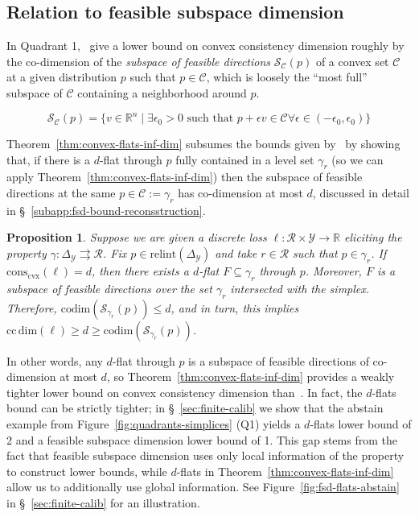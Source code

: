 \documentclass[11pt]{article} %
\newcommand{\reals}{\mathbb{R}}
\newcommand{\simplex}{\Delta_\Y}
\newcommand{\relint}[1]{\mathrm{relint}(#1)}
\newcommand{\conscvx}{\mathrm{cons}_\mathrm{cvx}}
\newcommand{\ccdim}{\mathrm{cc\,dim}}
\newcommand{\codim}{\mathrm{codim}}
\newcommand{\C}{\mathcal{C}}
\newcommand{\R}{\mathcal{R}}
\newcommand{\Sc}{\mathcal{S}}  %
\newcommand{\Y}{\mathcal{Y}}
\newcommand{\toto}{\rightrightarrows}
\newtheorem{proposition}{Proposition}
\begin{document}
\subsection{Relation to feasible subspace dimension}\label{sec:discrete-predictions-refactored}

In Quadrant 1,~\citet{ramaswamy2016convex} give a lower bound on convex consistency dimension roughly by the co-dimension of the \emph{subspace of feasible directions} $\Sc_{\C}(p)$ of a convex set $\C$ at a given distribution $p$ such that $p \in \C$, which is loosely the ``most full'' subspace of $\C$ containing a neighborhood around $p$.

\begin{equation*}\label{eq:feasible-subspace}
\Sc_\C(p) = \{v \in \reals^n \mid \exists \epsilon_0 > 0 \textrm{ such that } p + \epsilon v \in \C\forall \epsilon \in (-\epsilon_0, \epsilon_0) \}
\end{equation*}

Theorem~\ref{thm:convex-flats-inf-dim} subsumes the  bounds given by~\citet{ramaswamy2016convex} by showing that, if there is a $d$-flat through $p$ fully contained in a level set $\gamma_r$ (so we can apply Theorem~\ref{thm:convex-flats-inf-dim}) then the subspace of feasible directions at the same $p \in \C := \gamma_r$ has co-dimension at most $d$, discussed in detail in \S~\ref{subapp:fsd-bound-reconsstruction}.

\begin{proposition}\label{prop:discrete-bound-subsumes-ramaswamy}
	Suppose we are given a discrete loss $\ell : \R \times \Y \to \reals$ eliciting the property $\gamma: \simplex \toto \R$.
	Fix $p \in \relint \simplex$ and take $r \in \R$ such that $p \in \gamma_r$.  
	If $\conscvx(\ell) = d$, then there exists a $d$-flat $F \subseteq \gamma_r$ through $p$.
	Moreover, $F$ is a subspace of feasible directions over the set $\gamma_r$ intersected with the simplex.
	Therefore, $\codim(\Sc_{\gamma_r}(p)) \leq d$, and in turn, this implies $\ccdim(\ell) \geq d \geq \codim(\Sc_{\gamma_r}(p))$.
\end{proposition}

In other words, any $d$-flat through $p$ is a subspace of feasible directions of co-dimension at most $d$, so Theorem~\ref{thm:convex-flats-inf-dim} provides a weakly tighter lower bound on convex consistency dimension than~\citet[Theorem 16]{ramaswamy2016convex}.
In fact, the $d$-flats bound can be strictly tighter; in \S~\ref{sec:finite-calib} we show that the abstain example from Figure~\ref{fig:quadrants-simplices} (Q1) yields a $d$-flats lower bound of 2 and a feasible subspace dimension lower bound of 1.
This gap stems from the fact that feasible subspace dimension uses only local information of the property to construct lower bounds, while $d$-flats in Theorem~\ref{thm:convex-flats-inf-dim} allow us to additionally use global information.
See Figure~\ref{fig:fsd-flats-abstain} in \S~\ref{sec:finite-calib} for an illustration.
\end{document}

